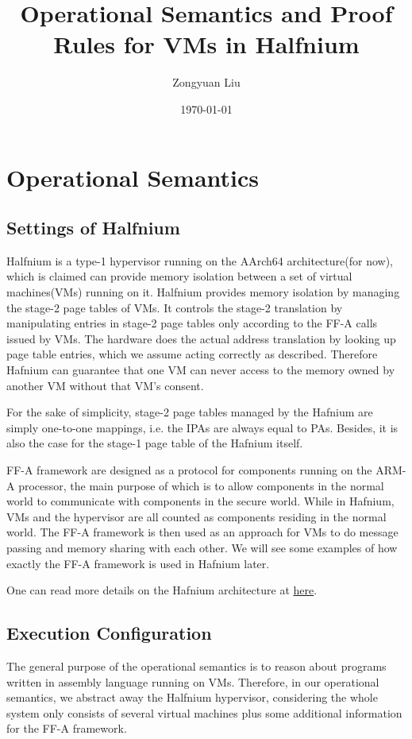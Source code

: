 \documentclass[a4paper]{article}
\title{Operational Semantics and Proof Rules for VMs in Halfnium} \date{\today}
\author{Zongyuan Liu}
\begin{document}
\maketitle

\section{Operational Semantics}

\subsection{Settings of Halfnium}
Halfnium is a type-1 hypervisor running on the AArch64 architecture(for now),
which is claimed can provide memory isolation between a set of virtual
machines(VMs) running on it. Halfnium provides memory isolation by managing the
stage-2 page tables of VMs. It controls the stage-2 translation by manipulating
entries in stage-2 page tables only according to the FF-A calls issued by VMs.
The hardware does the actual address translation by looking up page table
entries, which we assume acting correctly as described. Therefore Hafnium can
guarantee that one VM can never access to the memory owned by another VM without
that VM's consent.

For the sake of simplicity, stage-2 page tables managed by the Hafnium are
simply one-to-one mappings, i.e. the IPAs are always equal to PAs. Besides, it
is also the case for the stage-1 page table of the Hafnium itself.

FF-A framework are designed as a protocol for components running on the ARM-A
processor, the main purpose of which is to allow components in the normal world
to communicate with components in the secure world. While in Hafnium, VMs and
the hypervisor are all counted as components residing in the normal world. The
FF-A framework is then used as an approach for VMs to do message passing and
memory sharing with each other. We will see some examples of how exactly the
FF-A framework is used in Hafnium later.

One can read more details on the Hafnium architecture at
\href{https://review.trustedfirmware.org/plugins/gitiles/hafnium/hafnium/+/HEAD/docs/Architecture.md}{here}.

\subsection{Execution Configuration}
 The general purpose of the operational
semantics is to reason about programs written in assembly language running on
VMs. Therefore, in our operational semantics, we abstract away the Halfnium
hypervisor, considering the whole system only consists of several virtual
machines plus some additional information for the FF-A framework.
\end{document}
